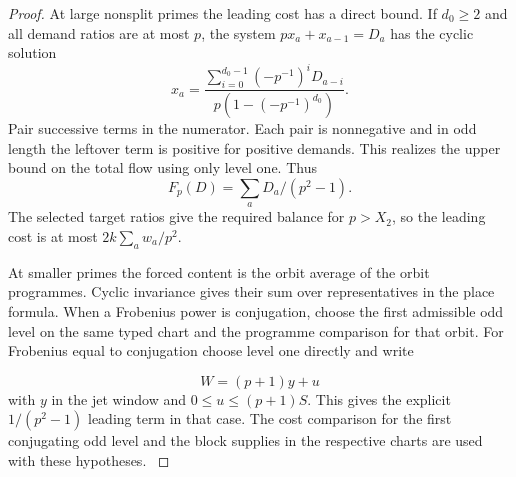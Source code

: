 \begin{proof}
At large nonsplit primes the leading cost has a direct
bound. If \(d_0\ge2\) and all demand ratios are at most \(p\), the system
\(p x_a+x_{a-1}=D_a\) has the cyclic solution
\[
 x_a=\frac{\sum_{i=0}^{d_0-1}(-p^{-1})^iD_{a-i}}
                {p(1-(-p^{-1})^{d_0})}.
\]
Pair successive terms in the numerator. Each pair is
nonnegative and in odd length the leftover term is
positive for positive demands. This realizes the upper
bound on the total flow using only level one. Thus
\[
 F_p(D)=\sum_a D_a/(p^2-1).
\]
The selected target ratios give the required balance for
\(p>X_2\), so the leading cost is at most
\(2k\sum_a w_a/p^2\).

At smaller primes the forced content is the orbit average
of the orbit programmes. Cyclic invariance gives their sum
over representatives in the place formula. When a
Frobenius power is conjugation, choose the first
admissible odd level on the same typed chart and the
programme comparison for that orbit. For Frobenius equal to
conjugation choose level one directly and write

\[
  W=(p+1)y+u
\]
 with \(y\) in the jet window and
\(0\le u\le(p+1)S\). This gives the explicit
\(1/(p^2-1)\) leading term in that case.
The cost comparison for the first conjugating odd level
and the block supplies in the respective charts are used
with these hypotheses.
\label{cor:slice-unscaled-depth-9}
\end{proof}

